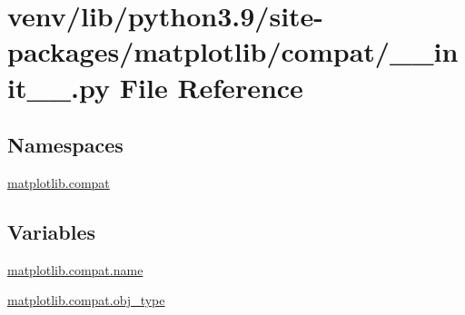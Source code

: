 \hypertarget{venv_2lib_2python3_89_2site-packages_2matplotlib_2compat_2____init_____8py}{}\section{venv/lib/python3.9/site-\/packages/matplotlib/compat/\+\_\+\+\_\+init\+\_\+\+\_\+.py File Reference}
\label{venv_2lib_2python3_89_2site-packages_2matplotlib_2compat_2____init_____8py}
\subsection*{Namespaces}
\begin{DoxyCompactItemize}
\item 
 \hyperlink{namespacematplotlib_1_1compat}{matplotlib.\+compat}
\end{DoxyCompactItemize}
\subsection*{Variables}
\begin{DoxyCompactItemize}
\item 
\hyperlink{namespacematplotlib_1_1compat_a5255471ef6c2a11babf3388e41338807}{matplotlib.\+compat.\+name}
\item 
\hyperlink{namespacematplotlib_1_1compat_a369743ca5a3991b7eb10d8f57f0dc0d8}{matplotlib.\+compat.\+obj\+\_\+type}
\end{DoxyCompactItemize}
